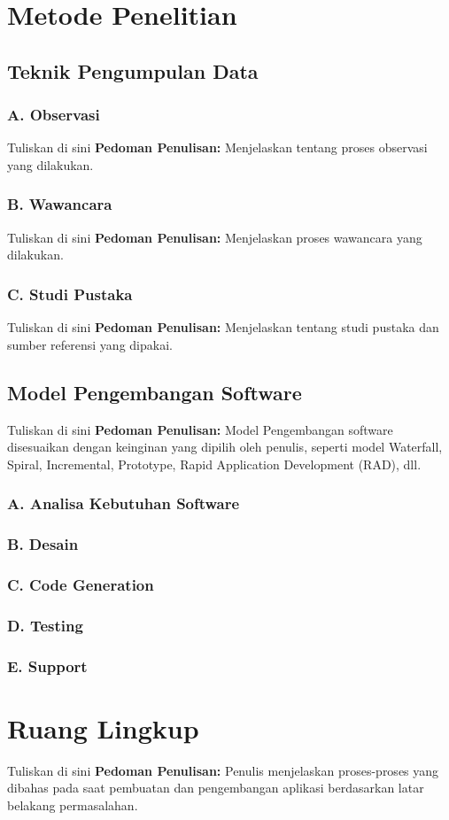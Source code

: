 \section{Metode Penelitian}
\subsection{Teknik Pengumpulan Data}
\subsubsection*{A. Observasi}


Tuliskan di sini \textbf{Pedoman Penulisan:} Menjelaskan tentang proses observasi yang dilakukan.


\subsubsection*{B. Wawancara}


Tuliskan di sini \textbf{Pedoman Penulisan:} Menjelaskan proses wawancara yang dilakukan.


\subsubsection*{C. Studi Pustaka}


Tuliskan di sini \textbf{Pedoman Penulisan:} Menjelaskan tentang studi pustaka dan sumber referensi yang dipakai.



\subsection{Model Pengembangan Software}


Tuliskan di sini \textbf{Pedoman Penulisan:} Model Pengembangan software disesuaikan dengan keinginan yang dipilih oleh penulis, seperti model Waterfall, Spiral, Incremental, Prototype, Rapid Application Development (RAD), dll.


\subsubsection*{A. Analisa Kebutuhan Software}
\subsubsection*{B. Desain}
\subsubsection*{C. Code Generation}
\subsubsection*{D. Testing}
\subsubsection*{E. Support}

\section{Ruang Lingkup}


Tuliskan di sini \textbf{Pedoman Penulisan:} Penulis menjelaskan proses-proses yang dibahas pada saat pembuatan dan pengembangan aplikasi berdasarkan latar belakang permasalahan.


